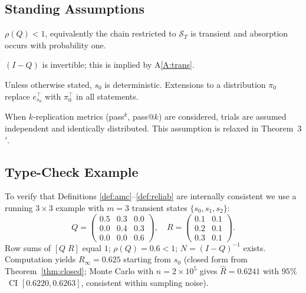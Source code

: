 \subsection{Standing Assumptions}

\begin{assumption}[Transience]\label{A:trans}
$\rho(Q)<1$, equivalently the chain restricted to $\mathcal{S}_T$ is
transient and absorption occurs with probability one.
\end{assumption}

\begin{assumption}[Invertibility]\label{A:inv}
$(I-Q)$ is invertible; this is implied by A\ref{A:trans}.
\end{assumption}

\begin{assumption}\label{A:init}
Unless otherwise stated, $s_0$ is deterministic.
Extensions to a distribution $\pi_0$ replace $e_{s_0}^\top$ with $\pi_0^\top$
in all statements.
\end{assumption}

\begin{assumption}[I.i.d.\ replications]\label{A:iid}
When $k$-replication metrics (pass$^k$, pass@$k$) are considered, trials are
assumed independent and identically distributed. This assumption is
relaxed in Theorem~3$'$.
\end{assumption}

\subsection{Type-Check Example}

To verify that Definitions \ref{def:amc}--\ref{def:reliab} are internally
consistent we use a running $3\times 3$ example with $m=3$ transient states
$\{s_0,s_1,s_2\}$:
\[
Q=\begin{pmatrix}
0.5 & 0.3 & 0.0\\
0.0 & 0.4 & 0.3\\
0.0 & 0.0 & 0.6
\end{pmatrix},\quad
R=\begin{pmatrix}
0.1 & 0.1\\
0.2 & 0.1\\
0.3 & 0.1
\end{pmatrix}.
\]
Row sums of $[Q\;R]$ equal $1$; $\rho(Q)=0.6<1$; $N=(I-Q)^{-1}$ exists.
Computation yields $R_\infty=0.625$ starting from $s_0$
(closed form from Theorem~\ref{thm:closed}; Monte Carlo with
$n=2\!\times\!10^{5}$ gives $\widehat{R}=0.6241$ with $95\%$~CI
$[0.6220,0.6263]$, consistent within sampling noise).
